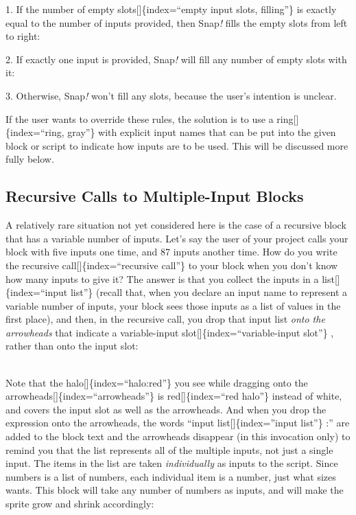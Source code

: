 \documentclass[
  letterpaper,
]{book}
\begin{document}
1. If the number of empty slots{[}{]}\{index=``empty input slots,
filling''\} is exactly equal to the number of inputs provided, then
Snap\emph{!} fills the empty slots from left to right:

2. If exactly one input is provided, Snap\emph{!} will fill any number
of empty slots with it:

3. Otherwise, Snap\emph{!} won't fill any slots, because the user's
intention is unclear.

If the user wants to override these rules, the solution is to use a
ring{[}{]}\{index=``ring, gray''\} with explicit input names that can be
put into the given block or script to indicate how inputs are to be
used. This will be discussed more fully below.

\subsection{Recursive Calls to Multiple-Input
Blocks}\label{recursive-calls-to-multiple-input-blocks}

A relatively rare situation not yet considered here is the case of a
recursive block that has a variable number of inputs. Let's say the user
of your project calls your block with five inputs one time, and 87
inputs another time. How do you write the recursive
call{[}{]}\{index=``recursive call''\} to your block when you don't know
how many inputs to give it? The answer is that you collect the inputs in
a list{[}{]}\{index=``input list''\} (recall that, when you declare an
input name to represent a variable number of inputs, your block sees
those inputs as a list of values in the first place), and then, in the
recursive call, you drop that input list \emph{onto the arrowheads} that
indicate a variable-input slot{[}{]}\{index=``variable-input slot''\} ,
rather than onto the input slot:

\strut \\
Note that the halo{[}{]}\{index=``halo:red''\} you see while dragging
onto the arrowheads{[}{]}\{index=``arrowheads''\} is
red{[}{]}\{index=``red halo''\} instead of white, and covers the input
slot as well as the arrowheads. And when you drop the expression onto
the arrowheads, the words ``input list{[}{]}\{index=''input list''\} :''
are added to the block text and the arrowheads disappear (in this
invocation only) to remind you that the list represents all of the
multiple inputs, not just a single input. The items in the list are
taken \emph{individually} as inputs to the script. Since numbers is a
list of numbers, each individual item is a number, just what sizes
wants. This block will take any number of numbers as inputs, and will
make the sprite grow and shrink accordingly:
\end{document}
